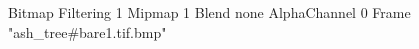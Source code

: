 {Bitmap
	{Filtering 1}
	{Mipmap 1}
	{Blend none}
	{AlphaChannel 0}
	{Frame "ash_tree#bare1.tif.bmp"}
}

